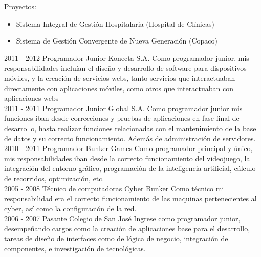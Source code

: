 \documentclass[]{friggeri-cv}
\begin{document}
\begin{entrylist}
{        Proyectos:
        \begin{itemize}
            \item Sistema Integral de Gestión Hospitalaria (Hospital de
                Clínicas)
            \item Sistema de Gestión Convergente de Nueva Generación (Copaco)
        \end{itemize}}
\entry
    {2011 - 2012}
    {Programador Junior}
    {Konecta S.A.}
    {Como programador junior, mis responsabilidades incluían el diseño y
        desarrollo de software para dispositivos móviles, y la creación de
        servicios webs, tanto servicios que interactuaban directamente con
        aplicaciones móviles, como otros que interactuaban con aplicaciones webs
        \\}
\entry
    {2011 - 2011}
    {Programador Junior}
    {Global S.A.}
    {Como programador junior mis funciones iban desde correcciones y pruebas de
        aplicaciones en fase final de desarrollo, hasta realizar funciones
        relacionadas con el mantenimiento de la base de datos y su correcto
        funcionamiento. Además de administración de servidores. \\}
\entry
    {2010 - 2011}
    {Programador}
    {Bunker Games}
    {Como programador principal y único, mis responsabilidades iban desde la
        correcto funcionamiento del videojuego, la integración del entorno
        gráfico, programación de la inteligencia artificial, cálculo de
        recorridos, optimización, etc. \\}
\entry
    {2005 - 2008}
    {Técnico de computadoras}
    {Cyber Bunker}
    {Como técnico mi responsabilidad era el correcto funcionamiento de las
        maquinas pertenecientes al cyber, así como la configuración de la red.
        \\}
\entry
    {2006 - 2007}
    {Pasante}
    {Colegio de San José}
    {Ingrese como programador junior, desempeñando cargos como la
creación de aplicaciones base para el desarrollo, tareas de diseño de
interfaces como de lógica de negocio, integración de componentes, e
investigación de tecnológicas. \\}

\end{entrylist}


\newpage
\end{document}
